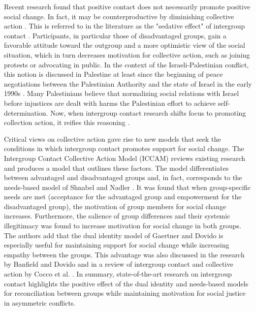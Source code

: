 \documentclass[dissertation,math,vertlayout,pdfa,colorlinks]{aaltoseries}
\begin{document}
Recent research found that positive contact does not necessarily promote positive social change. In fact, it may be counterproductive by diminishing collective action \cite{saguyIronyHarmonyIntergroup2009,dixonLetThemEat2010,dixonPrejudiceAreNegative2012}. This is referred to in the literature as the "sedative effect" of intergroup contact \cite{cakalInvestigationSocialIdentity2011}. Participants, in particular those of disadvantaged groups, gain a favorable attitude toward the outgroup and a more optimistic view of the social situation, which in turn decreases motivation for collective action, such as joining protests or advocating in public. In the context of the Israeli-Palestinian conflict, this notion is discussed in Palestine at least since the beginning of peace negotiations between the Palestinian Authority and the state of Israel in the early 1990s \cite{miariAttitudesPalestiniansNormalization1999}. Many Palestinians believe that normalizing social relations with Israel before injustices are dealt with harms the Palestinian effort to achieve self-determination. Now, when intergroup contact research shifts focus to promoting collection action, it reifies this reasoning \cite{albzourSupportNormalizationRelations2019}.

Critical views on collective action gave rise to new models that seek the conditions in which intergroup contact promotes support for social change. The Intergroup Contact Collective Action Model (ICCAM)\cite{hasslerIntergroupContactSocial2021} reviews existing research and produces a model that outlines these factors. The model differentiates between advantaged and disadvantaged groups and, in fact, corresponds to the needs-based model of Shnabel and Nadler \cite{hasslerNeedSatisfactionIntergroup2022,shnabelChapterFourNeedsbased2023}. It was found that when group-specific needs are met (acceptance for the advantaged group and empowerment for the disadvantaged group), the motivation of group members for social change increases. Furthermore, the salience of group differences and their systemic illegitimacy was found to increase motivation for social change in both groups. The authors add that the dual identity model of Gaertner and Dovido is especially useful for maintaining support for social change while increasing empathy between the groups. This advantage was also discussed in the research by Banfield and Dovido \cite{banfieldWhitesPerceptionsDiscrimination2013} and in a review of intergroup contact and collective action by Cocco et al. \cite{coccoMobilizingSedativeEffects2024}. In summary, state-of-the-art research on intergroup contact highlights the positive effect of the dual identity and needs-based models for reconciliation between groups while maintaining motivation for social justice in asymmetric conflicts.
\end{document}
